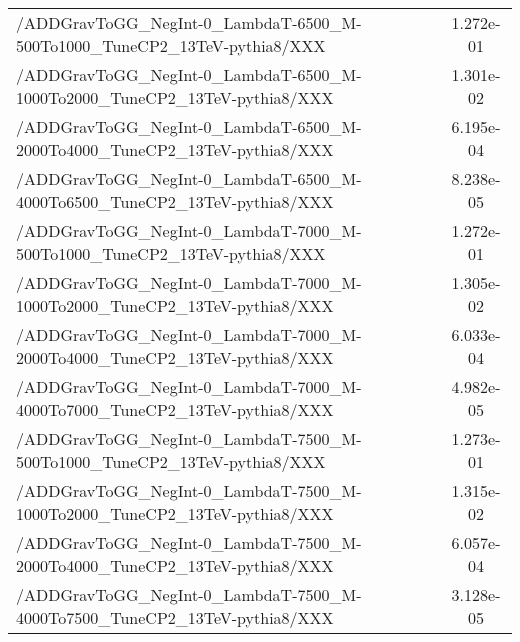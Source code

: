 \begin{landscape}
\begin{table}[!htbp]
\begin{tabular}{lc}
/ADDGravToGG\_NegInt-0\_LambdaT-6500\_M-500To1000\_TuneCP2\_13TeV-pythia8/XXX &  1.272e-01\\
/ADDGravToGG\_NegInt-0\_LambdaT-6500\_M-1000To2000\_TuneCP2\_13TeV-pythia8/XXX &  1.301e-02\\
/ADDGravToGG\_NegInt-0\_LambdaT-6500\_M-2000To4000\_TuneCP2\_13TeV-pythia8/XXX &  6.195e-04\\
/ADDGravToGG\_NegInt-0\_LambdaT-6500\_M-4000To6500\_TuneCP2\_13TeV-pythia8/XXX &  8.238e-05\\
/ADDGravToGG\_NegInt-0\_LambdaT-7000\_M-500To1000\_TuneCP2\_13TeV-pythia8/XXX &  1.272e-01\\
/ADDGravToGG\_NegInt-0\_LambdaT-7000\_M-1000To2000\_TuneCP2\_13TeV-pythia8/XXX &  1.305e-02\\
/ADDGravToGG\_NegInt-0\_LambdaT-7000\_M-2000To4000\_TuneCP2\_13TeV-pythia8/XXX &  6.033e-04\\
/ADDGravToGG\_NegInt-0\_LambdaT-7000\_M-4000To7000\_TuneCP2\_13TeV-pythia8/XXX &  4.982e-05\\
/ADDGravToGG\_NegInt-0\_LambdaT-7500\_M-500To1000\_TuneCP2\_13TeV-pythia8/XXX &  1.273e-01\\
/ADDGravToGG\_NegInt-0\_LambdaT-7500\_M-1000To2000\_TuneCP2\_13TeV-pythia8/XXX &  1.315e-02\\
/ADDGravToGG\_NegInt-0\_LambdaT-7500\_M-2000To4000\_TuneCP2\_13TeV-pythia8/XXX &  6.057e-04\\
/ADDGravToGG\_NegInt-0\_LambdaT-7500\_M-4000To7500\_TuneCP2\_13TeV-pythia8/XXX &  3.128e-05\\

       \hline \hline
       \end{tabular}
       \label{table:ADD_signal_samples_xsec}
\end{table}
\end{landscape}

